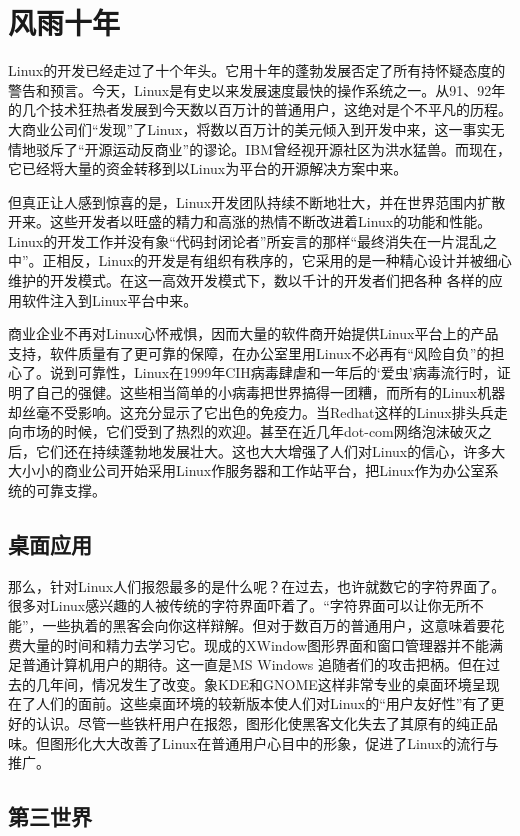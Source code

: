 \documentclass[12pt,a4paper]{article}
\begin{document}
\section{风雨十年}
\label{sec-4}

  Linux的开发已经走过了十个年头。它用十年的蓬勃发展否定了所有持怀疑态度的警告和预言。今天，Linux是有史以来发展速度最快的操作系统之一。从91、92年的几个技术狂热者发展到今天数以百万计的普通用户，这绝对是个不平凡的历程。大商业公司们“发现”了Linux，将数以百万计的美元倾入到开发中来，这一事实无情地驳斥了“开源运动反商业”的谬论。IBM曾经视开源社区为洪水猛兽。而现在，它已经将大量的资金转移到以Linux为平台的开源解决方案中来。

  但真正让人感到惊喜的是，Linux开发团队持续不断地壮大，并在世界范围内扩散开来。这些开发者以旺盛的精力和高涨的热情不断改进着Linux的功能和性能。Linux的开发工作并没有象“代码封闭论者”所妄言的那样“最终消失在一片混乱之中”。正相反，Linux的开发是有组织有秩序的，它采用的是一种精心设计并被细心维护的开发模式。在这一高效开发模式下，数以千计的开发者们把各种 各样的应用软件注入到Linux平台中来。

  商业企业不再对Linux心怀戒惧，因而大量的软件商开始提供Linux平台上的产品支持，软件质量有了更可靠的保障，在办公室里用Linux不必再有“风险自负”的担心了。说到可靠性，Linux在1999年CIH病毒肆虐和一年后的‘爱虫’病毒流行时，证明了自己的强健。这些相当简单的小病毒把世界搞得一团糟，而所有的Linux机器却丝毫不受影响。这充分显示了它出色的免疫力。当Redhat这样的Linux排头兵走向市场的时候，它们受到了热烈的欢迎。甚至在近几年dot-com网络泡沫破灭之后，它们还在持续蓬勃地发展壮大。这也大大增强了人们对Linux的信心，许多大大小小的商业公司开始采用Linux作服务器和工作站平台，把Linux作为办公室系统的可靠支撑。
\subsection{桌面应用}
\label{sec-4-1}

   那么，针对Linux人们报怨最多的是什么呢？在过去，也许就数它的字符界面了。很多对Linux感兴趣的人被传统的字符界面吓着了。“字符界面可以让你无所不能”，一些执着的黑客会向你这样辩解。但对于数百万的普通用户，这意味着要花费大量的时间和精力去学习它。现成的XWindow图形界面和窗口管理器并不能满足普通计算机用户的期待。这一直是MS Windows 追随者们的攻击把柄。但在过去的几年间，情况发生了改变。象KDE和GNOME这样非常专业的桌面环境呈现在了人们的面前。这些桌面环境的较新版本使人们对Linux的“用户友好性”有了更好的认识。尽管一些铁杆用户在报怨，图形化使黑客文化失去了其原有的纯正品味。但图形化大大改善了Linux在普通用户心目中的形象，促进了Linux的流行与推广。
\subsection{第三世界}
\label{sec-4-2}
\end{document}
